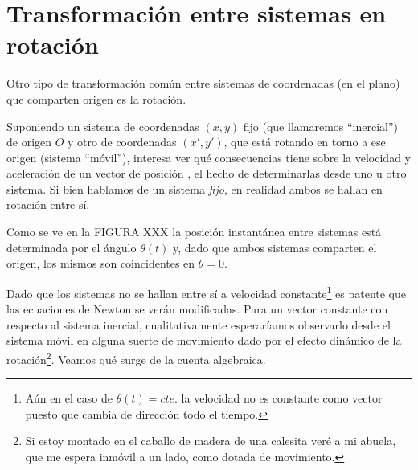 \documentclass[10pt,oneside]{CBFT_book}
\begin{document}
\section{Transformación entre sistemas en rotación}

Otro tipo de transformación común entre sistemas de coordenadas (en el plano) que comparten origen es la rotación.

Suponiendo un sistema de coordenadas $(x,y)$ fijo (que llamaremos ``inercial'') de origen $O$ y otro de coordenadas 
$(x',y')$, que está rotando en torno a ese origen (sistema ``móvil''), interesa ver qué consecuencias tiene sobre la 
velocidad y aceleración de un vector de posición , el hecho de determinarlas desde uno u otro sistema. Si bien 
hablamos de un sistema {\it fijo}, en realidad ambos se hallan en rotación entre sí. 

Como se ve en la FIGURA XXX 
la posición instantánea entre sistemas está determinada por el ángulo $\theta(t)$ y, dado que ambos sistemas comparten 
el origen, los mismos son coincidentes en $\theta = 0$. 

Dado que los sistemas no se hallan entre sí a velocidad constante\footnote{Aún en el caso de $ \theta(t) = cte.$ la 
velocidad no es constante como vector puesto que cambia de dirección todo el tiempo.} es patente que las ecuaciones de 
Newton se verán modificadas.
Para un vector  constante con respecto al sistema inercial, cualitativamente esperaríamos observarlo desde el 
sistema móvil en alguna suerte de movimiento dado por el efecto dinámico de la rotación\footnote{Si estoy montado en el 
caballo de madera de una calesita veré a mi abuela, que me espera inmóvil a un lado, como dotada de movimiento.}. Veamos 
qué surge de la cuenta algebraica.
\end{document}
